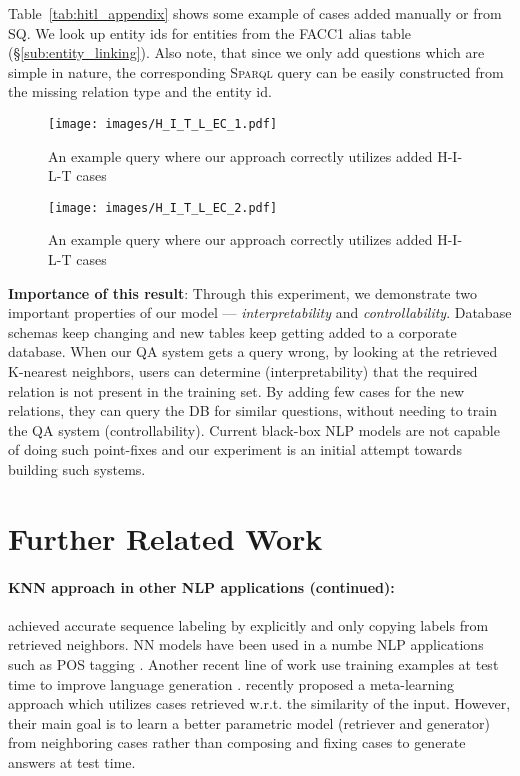 \documentclass[11pt]{article}
\newcommand{\spql}{\textsc{Sparql}\xspace}
\begin{document}
Table~\ref{tab:hitl_appendix} shows some example of cases added manually or from SQ. We look up entity ids for entities from the FACC1 alias table (\S\ref{sub:entity_linking}). Also note, that since we only add questions which are simple in nature, the corresponding \spql query can be easily constructed from the missing relation type and the entity id.

\begin{figure}
    \centering
    \vspace{-3mm}
    \texttt{[image: images/H\_I\_T\_L\_EC\_1.pdf]}
    \caption{\small An example query where our approach correctly utilizes added H-I-L-T cases}
    \vspace{-5mm}
    \label{fig:hitl_ec1}
\end{figure}
\begin{figure}
    \centering
    \vspace{-3mm}
    \texttt{[image: images/H\_I\_T\_L\_EC\_2.pdf]}
    \caption{\small An example query where our approach correctly utilizes added H-I-L-T cases}
    \vspace{-5mm}
    \label{fig:hitl_ec2}
\end{figure}


\textbf{Importance of this result}: Through this experiment, we demonstrate two important properties of our model --- \emph{interpretability} and \emph{controllability}. Database schemas keep changing and new tables keep getting added to a corporate database. When our QA system gets a query wrong, by looking at the retrieved K-nearest neighbors, users can determine (interpretability) that the required relation is not present in the training set. By adding few cases for the new relations, they can query the DB for similar questions, without needing to train the QA system (controllability). Current black-box NLP models are not capable of doing such point-fixes and our experiment is an initial attempt towards building such systems. 

\section{Further Related Work}
\label{sec:further_related_work}
\paragraph{\textbf{KNN approach in other NLP applications (continued)}:}
\citet{wiseman-stratos-2019-label} achieved accurate sequence labeling by explicitly and only copying labels from retrieved neighbors. NN models have been used in a numbe NLP applications such as POS tagging \cite{daelemans1996mbt}. Another recent line of work use training examples at test time to improve language generation \cite{weston-etal-2018-retrieve,pandey-etal-2018-exemplar,cao-etal-2018-retrieve,peng-etal-2019-text}. \citet{hua2020retrieve} recently proposed a meta-learning approach which utilizes cases retrieved w.r.t. the similarity of the input. However, their main goal is to learn a better parametric model (retriever and generator) from neighboring cases rather than composing and fixing cases to generate answers at test time.
\end{document}
